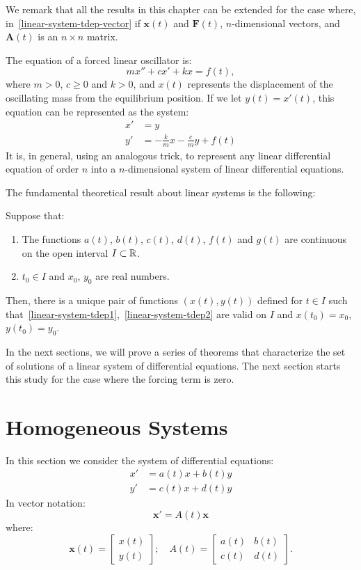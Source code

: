 We remark that all the results in this chapter can be extended for the case where, in~\eqref{linear-system-tdep-vector} if $\mathbf{x}(t)$ and $\mathbf{F}(t)$, $n$-dimensional vectors, and $\mathbf{A}(t)$ is an $n\times n$ matrix.

\begin{example}
The equation of a forced linear oscillator is:
\[
mx''+cx'+kx=f(t),
\]
where $m>0$, $c\ge0$ and $k>0$, and $x(t)$ represents the displacement of the oscillating mass from the equilibrium position. If we let $y(t)=x'(t)$, this equation can be represented as the system:
\begin{align*}
x'&=y\\
y'&=-\frac{k}{m}x-\frac{c}{m}y+f(t)
\end{align*}
It is, in general, using an analogous trick, to represent any linear differential equation of order $n$ into a $n$-dimensional system of linear differential equations.
\end{example}

The fundamental theoretical result about linear systems is the following:

\begin{theorem} 
\label{theorem-exitence-uniqueness-linear-systems}
Suppose that:
\begin{enumerate}
\item The functions $a(t)$, $b(t)$, $c(t)$, $d(t)$, $f(t)$ and $g(t)$ are continuous on the open interval $I\subset\mathbb{R}$.
\item $t_0\in I$ and $x_0$, $y_0$ are real numbers.
\end{enumerate}
Then, there is a unique pair of functions $(x(t),y(t))$ defined for $t\in I$ such that~\eqref{linear-system-tdep1},~\eqref{linear-system-tdep2} are valid on $I$ and $x(t_0)=x_0$, $y(t_0)=y_0$.
\end{theorem}

In the next sections, we will prove a series of theorems that characterize the set of solutions of a linear system of differential equations. The next section starts this study for the case where the forcing term is zero.

\section{Homogeneous Systems} In this section we consider the system of differential equations:
\begin{align}
\label{linear-system-homo-tdep1}
x'&=a(t)x+b(t)y\\
\label{linear-system-homo-tdep2}
y'&=c(t)x+d(t)y
\end{align}
In vector notation:
\begin{equation}
\label{linear-system-homo-tdep-vector}
\mathbf{x}'=A(t)\mathbf{x}
\end{equation}
where:
\[
\mathbf{x}(t)=\begin{bmatrix}x(t)\\y(t)\end{bmatrix};\quad
A(t)=\begin{bmatrix}a(t)&b(t)\\c(t)&d(t)\end{bmatrix}.
\]

